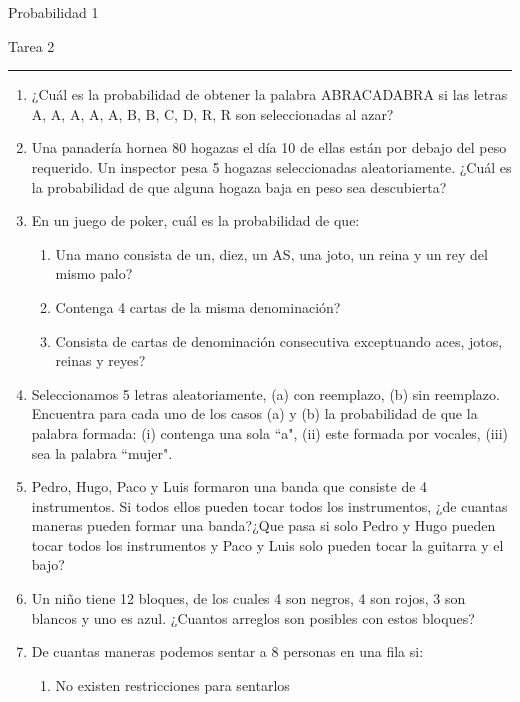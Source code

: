 \documentclass[12pt]{report}
\begin{document}
\begin{center}
    \textsf{\Large Probabilidad 1}
    \par\medskip
    \textsf{\large Tarea 2}
\end{center}
\hrule
\par\bigskip

\begin{enumerate}
    \item ¿Cuál es la probabilidad de obtener la palabra ABRACADABRA si las letras A, A, A, A, A, B, B, C, D, R, R son seleccionadas al azar?
    \item Una panadería hornea 80 hogazas el día 10 de ellas están por debajo del peso requerido. Un inspector pesa 5 hogazas seleccionadas aleatoriamente. ¿Cuál es la probabilidad de que alguna hogaza baja en peso sea descubierta?
    \item En un juego de poker, cuál es la probabilidad de que:
          \begin{enumerate}
              \item Una mano consista de un, diez, un AS, una joto, un reina y un rey del mismo palo?
              \item Contenga 4 cartas de la misma denominación?
              \item Consista de cartas de denominación consecutiva exceptuando aces, jotos, reinas y reyes?
          \end{enumerate}
    \item Seleccionamos 5 letras aleatoriamente, (a) con reemplazo, (b) sin reemplazo. Encuentra para cada uno de los casos (a) y (b) la probabilidad de que la palabra formada: (i) contenga una sola ``a", (ii) este formada por vocales, (iii) sea la palabra ``mujer".
    \item Pedro, Hugo, Paco y Luis formaron una banda que consiste de 4 instrumentos. Si todos ellos pueden tocar todos los instrumentos, ¿de cuantas maneras pueden formar una banda?¿Que pasa si solo Pedro y Hugo pueden tocar todos los instrumentos y Paco y Luis solo pueden tocar la guitarra y el bajo?
    \item Un niño tiene 12 bloques, de los cuales 4 son negros, 4 son rojos, 3 son blancos y uno es azul. ¿Cuantos arreglos son posibles con estos bloques?
    \item De cuantas maneras podemos sentar a 8 personas en una fila si:
          \begin{enumerate}
              \item No existen restricciones para sentarlos

\end{enumerate}
\end{enumerate}
\end{document}
